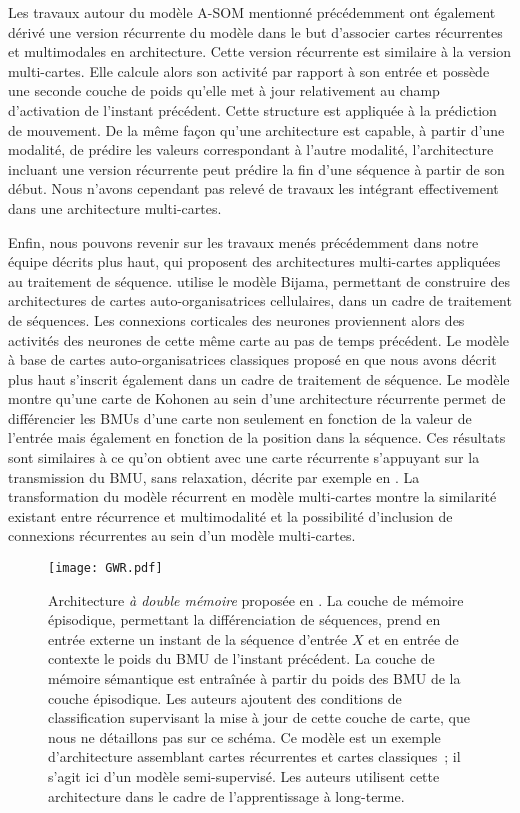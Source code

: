 \documentclass[../main]{subfiles}
\begin{document}
Les travaux autour du modèle A-SOM mentionné précédemment ont également dérivé une version récurrente du modèle \cite{Buonamente2015DiscriminatingAS} dans le but d'associer cartes récurrentes et multimodales en architecture.
Cette version récurrente est similaire à la version multi-cartes. Elle calcule alors son activité par rapport à son entrée et possède une seconde couche de poids qu'elle met à jour relativement au champ d'activation de l'instant précédent.
Cette structure est appliquée à la prédiction de mouvement. De la même façon qu'une architecture est capable, à partir d'une modalité, de prédire les valeurs correspondant à l'autre modalité, l'architecture incluant une version récurrente peut prédire la fin d'une séquence à partir de son début.
Nous n'avons cependant pas relevé de travaux les intégrant effectivement dans une architecture multi-cartes.

Enfin, nous pouvons revenir sur les travaux menés précédemment dans notre équipe décrits plus haut, qui proposent des architectures multi-cartes appliquées au traitement de séquence.
\cite{khouzam_neural_2014} utilise le modèle Bijama, permettant de construire des architectures de cartes auto-organisatrices cellulaires, dans un cadre de traitement de séquences.
Les connexions corticales des neurones proviennent alors des activités des neurones de cette même carte au pas de temps précédent.
Le modèle à base de cartes auto-organisatrices classiques proposé en \cite{baheux_towards_2014} que nous avons décrit plus haut s'inscrit également dans un cadre de traitement de séquence. Le modèle montre qu'une carte de Kohonen au sein d'une architecture récurrente permet de différencier les BMUs d'une carte non seulement en fonction de la valeur de l'entrée mais également en fonction de la position dans la séquence. Ces résultats sont similaires à ce qu'on obtient avec une carte récurrente s'appuyant sur la transmission du BMU, sans relaxation, décrite par exemple en \cite{fix20}. La transformation du modèle récurrent en modèle multi-cartes montre la similarité existant entre récurrence et multimodalité et la possibilité d'inclusion de connexions récurrentes au sein d'un modèle multi-cartes.


\begin{figure}
    \centering
    \texttt{[image: GWR.pdf]}
    \caption{Architecture \emph{à double mémoire} proposée en \cite{parisiLL}. 
    La couche de mémoire épisodique, permettant la différenciation de séquences, prend en entrée externe un instant de la séquence d'entrée $X$ et en entrée de contexte le poids du BMU de l'instant précédent.
    La couche de mémoire sémantique est entraînée à partir du poids des BMU de la couche épisodique. Les auteurs ajoutent des conditions de classification supervisant la mise à jour de cette couche de carte, que nous ne détaillons pas sur ce schéma. Ce modèle est un exemple d'architecture assemblant cartes récurrentes et cartes classiques~; il s'agit ici d'un modèle semi-supervisé. Les auteurs utilisent cette architecture dans le cadre de l'apprentissage à long-terme.\label{fig:parisi}}
\end{figure}
\end{document}
